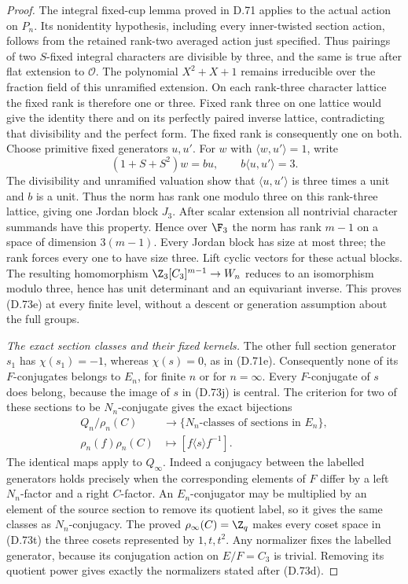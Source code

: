 \begin{proof}
The integral fixed-cup lemma proved in D.71 applies
to the actual action on \(P_n\).
Its nonidentity hypothesis, including every inner-twisted
section action, follows from the retained rank-two
averaged action just specified.
Thus pairings of two \(S\)-fixed integral characters
are divisible by three, and the same is true after
flat extension to \(\mathcal O\).
The polynomial \(X^2+X+1\) remains irreducible over
the fraction field of this unramified extension.
On each rank-three character lattice the fixed rank
is therefore one or three. Fixed rank three on
one lattice would give the identity there and on
its perfectly paired inverse lattice, contradicting
that divisibility and the perfect form.
The fixed rank is consequently one on both.
Choose primitive fixed generators \(u,u'\).
For \(w\) with \(\langle w,u'\rangle=1\), write
\[
   (1+S+S^2)w=b u,\qquad
                  b\langle u,u'\rangle=3 .
                                                               \tag{D.73s}
\]
The divisibility and unramified valuation show that
\(\langle u,u'\rangle\) is three times a unit and
\(b\) is a unit. Thus the norm has rank one modulo
three on this rank-three lattice, giving one Jordan
block \(J_3\).
After scalar extension all nontrivial character
summands have this property. Hence over \(\F_3\)
the norm has rank \(m-1\) on a space of dimension
\(3(m-1)\). Every Jordan block has size at most three;
the rank forces every one to have size three.
Lift cyclic vectors for these actual blocks.
The resulting homomorphism
\(\Z_3[C_3]^{m-1}\to W_n\) reduces to an isomorphism
modulo three, hence has unit determinant and an
equivariant inverse. This proves (D.73e) at every
finite level, without a descent or generation
assumption about the full groups.

\emph{The exact section classes and their fixed kernels.}
The other full section generator \(s_1\) has
\(\chi(s_1)=-1\), whereas \(\chi(s)=0\), as in (D.71e).
Consequently none of its \(F\)-conjugates belongs
to \(E_n\), for finite \(n\) or for \(n=\infty\).
Every \(F\)-conjugate of \(s\) does belong, because
the image of \(s\) in (D.73j) is central.
The criterion for two of these sections to be
\(N_n\)-conjugate gives the exact bijections
\[
 \begin{aligned}
 Q_n/\rho_n(C)&\longrightarrow
        \{\text{\(N_n\)-classes of sections in \(E_n\)}\},\\
 \rho_n(f)\rho_n(C)&\longmapsto
                         [f\langle s\rangle f^{-1}] .
 \end{aligned}                                                 \tag{D.73t}
\]
The identical maps apply to \(Q_\infty\).
Indeed a conjugacy between the labelled generators
holds precisely when the corresponding elements
of \(F\) differ by a left \(N_n\)-factor and a
right \(C\)-factor. An \(E_n\)-conjugator may be
multiplied by an element of the source section to
remove its quotient label, so it gives the same
classes as \(N_n\)-conjugacy.
The proved \(\rho_\infty(C)=\Z_q\) makes every coset
space in (D.73t) the three cosets represented by
\(1,t,t^2\).
Any normalizer fixes the labelled generator,
because its conjugation action on \(E/F=C_3\) is
trivial. Removing its quotient power gives exactly
the normalizers stated after (D.73d).


\end{proof}
